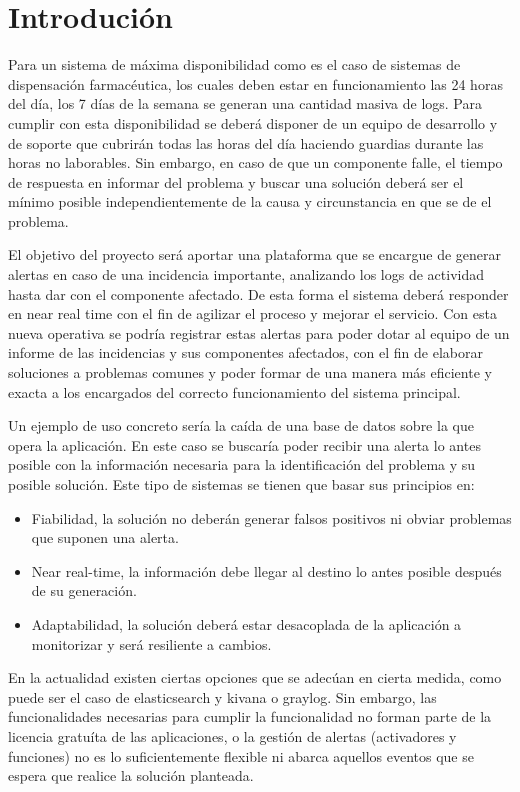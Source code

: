 \chapter{Introdución}

Para un sistema de máxima disponibilidad como es el caso de sistemas de dispensación farmacéutica, los cuales deben estar en funcionamiento las 24 horas del día, los 7 días de la semana se generan una cantidad masiva de logs. Para cumplir con esta disponibilidad se deberá disponer de un equipo de desarrollo y de soporte que cubrirán todas las horas del día haciendo guardias durante las horas no laborables. Sin embargo, en caso de que un componente falle, el tiempo de respuesta en informar del problema y buscar una solución deberá ser el mínimo posible independientemente de la causa y circunstancia en que se de el problema.

El objetivo del proyecto será aportar una plataforma que se encargue de generar alertas en caso de una incidencia importante, analizando los logs de actividad hasta dar con el componente afectado. De esta forma el sistema deberá responder en near real time con el fin de agilizar el proceso y mejorar el servicio. Con esta nueva operativa se podría registrar estas alertas para poder dotar al equipo de un informe de las incidencias y sus componentes afectados, con el fin de elaborar soluciones a problemas comunes y poder formar de una manera más eficiente y exacta a los encargados del correcto funcionamiento del sistema principal. 

Un ejemplo de uso concreto sería la caída de una base de datos sobre la que opera la aplicación. En este caso se buscaría poder recibir una alerta lo antes posible con la información necesaria para la identificación del problema y su posible solución. Este tipo de sistemas se tienen que basar sus principios en:

\begin{itemize}
	\item Fiabilidad, la solución no deberán generar falsos positivos ni obviar problemas que suponen una alerta.
	\item Near real-time, la información debe llegar al destino lo antes posible después de su generación.
	\item Adaptabilidad, la solución deberá estar desacoplada de la aplicación a monitorizar y será resiliente a cambios.
\end{itemize}

En la actualidad existen ciertas opciones que se adecúan en cierta medida, como puede ser el caso de elasticsearch y kivana o graylog. Sin embargo, las funcionalidades necesarias para cumplir la funcionalidad no forman parte de la licencia gratuíta de las aplicaciones, o la gestión de alertas (activadores y funciones) no es lo suficientemente flexible ni abarca aquellos eventos que se espera que realice la solución planteada.

